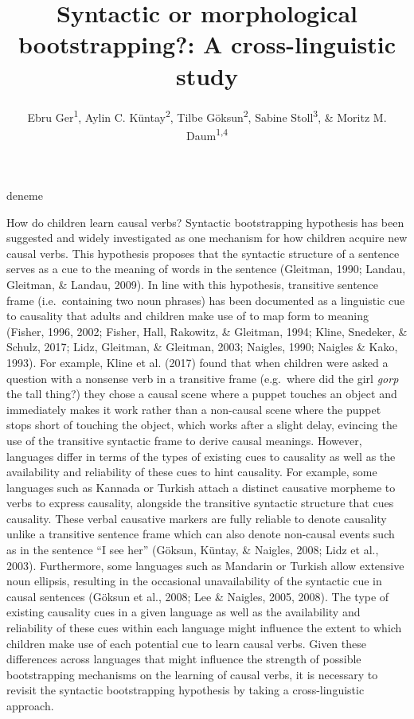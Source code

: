 \documentclass[man]{apa6}
\title{Syntactic or morphological bootstrapping?: A cross-linguistic study}
\author{Ebru Ger\textsuperscript{1}, Aylin C. Küntay\textsuperscript{2}, Tilbe
Göksun\textsuperscript{2}, Sabine Stoll\textsuperscript{3}, \& Moritz M.
Daum\textsuperscript{1,4}}
\date{}
\affiliation{
\vspace{0.5cm}
\textsuperscript{1} Department of Psychology, University of Zurich\\\textsuperscript{2} Department of Psychology, Koç University\\\textsuperscript{3} Institute of Comparative Linguistics, University of Zurich\\\textsuperscript{4} Neuroscience Center Zurich, University of Zurich and ETH Zurich}
\begin{document}
\maketitle

deneme

How do children learn causal verbs? Syntactic bootstrapping hypothesis
has been suggested and widely investigated as one mechanism for how
children acquire new causal verbs. This hypothesis proposes that the
syntactic structure of a sentence serves as a cue to the meaning of words in the
sentence \cite{gleitman1990structural} (Gleitman, 1990; Landau, Gleitman, \& Landau,
2009). In line with this hypothesis, transitive sentence frame (i.e.~containing two
noun phrases) has been documented as a linguistic cue to causality that
adults and children make use of to map form to meaning (Fisher, 1996,
2002; Fisher, Hall, Rakowitz, \& Gleitman, 1994; Kline, Snedeker, \&
Schulz, 2017; Lidz, Gleitman, \& Gleitman, 2003; Naigles, 1990; Naigles \& Kako,
1993). For example, Kline et al. (2017) found that when
children were asked a question with a nonsense verb in a transitive
frame (e.g.~where did the girl \emph{gorp} the tall thing?) they chose a
causal scene where a puppet touches an object and immediately makes it
work rather than a non-causal scene where the puppet stops short of
touching the object, which works after a slight delay, evincing the use
of the transitive syntactic frame to derive causal meanings. However,
languages differ in terms of the types of existing cues to causality as
well as the availability and reliability of these cues to hint
causality. For example, some languages such as Kannada or Turkish attach
a distinct causative morpheme to verbs to express causality, alongside
the transitive syntactic structure that cues causality. These verbal
causative markers are fully reliable to denote causality unlike a
transitive sentence frame which can also denote non-causal events such
as in the sentence \enquote{I see her} (Göksun, Küntay, \& Naigles,
2008; Lidz et al., 2003). Furthermore, some languages such as Mandarin
or Turkish allow extensive noun ellipsis, resulting in the occasional
unavailability of the syntactic cue in causal sentences (Göksun et al.,
2008; Lee \& Naigles, 2005, 2008). The type of existing causality cues
in a given language as well as the availability and reliability of these
cues within each language might influence the extent to which children
make use of each potential cue to learn causal verbs. Given these
differences across languages that might influence the strength of
possible bootstrapping mechanisms on the learning of causal verbs, it is
necessary to revisit the syntactic bootstrapping hypothesis by taking a
cross-linguistic approach.
\end{document}
